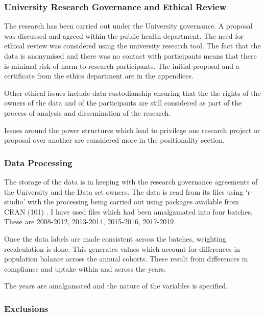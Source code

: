 \documentclass[
]{article}
\begin{document}
\hypertarget{university-research-governance-and-ethical-review}{%
\subsubsection{University Research Governance and Ethical
Review}\label{university-research-governance-and-ethical-review}}

The research has been carried out under the University governance. A
proposal was discussed and agreed within the public health department.
The need for ethical review was considered using the university research
tool. The fact that the data is anonymised and there was no contact with
participants means that there is minimal risk of harm to research
participants. The initial proposal and a certificate from the ethics
department are in the appendices.

Other ethical issues include data custodianship ensuring that the the
rights of the owners of the data and of the participants are still
considered as part of the process of analysis and dissemination of the
research.

Issues around the power structures which lead to privilege one research
project or proposal over another are considered more in the
positionality section.

\hypertarget{data-processing}{%
\subsubsection{Data Processing}\label{data-processing}}

The storage of the data is in keeping with the research governance
agreements of the University and the Data set owners. The data is read
from its files using `r-studio' with the processing being carried out
using packages available from CRAN (101) . I have used files which had
been amalgamated into four batches. These are 2008-2012, 2013-2014,
2015-2016, 2017-2019.

Once the data labels are made consistent across the batches, weighting
recalculation is done. This generates values which account for
differences in population balance across the annual cohorts. These
result from differences in compliance and uptake within and across the
years.

The years are amalgamated and the nature of the variables is specified.

\hypertarget{exclusions}{%
\subsubsection{Exclusions}\label{exclusions}}
\end{document}
